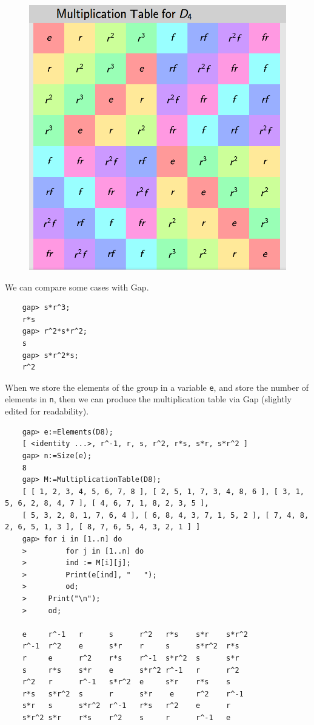 \begin{figure}[H]
    \centering
    \includegraphics[scale=0.25]{images/2023-06-05_groups_gap_D4.png}
\end{figure}

We can compare some cases with Gap.

\begin{verbatim}
    gap> s*r^3;
    r*s
    gap> r^2*s*r^2;
    s
    gap> s*r^2*s;
    r^2
\end{verbatim}

When we store the elements of the group in a variable \verb+e+, and store the number of elements in \verb+n+, then we can produce the multiplication table via Gap (slightly edited for readability).

\begin{verbatim}
    gap> e:=Elements(D8);
    [ <identity ...>, r^-1, r, s, r^2, r*s, s*r, s*r^2 ]
    gap> n:=Size(e);
    8
    gap> M:=MultiplicationTable(D8);
    [ [ 1, 2, 3, 4, 5, 6, 7, 8 ], [ 2, 5, 1, 7, 3, 4, 8, 6 ], [ 3, 1, 5, 6, 2, 8, 4, 7 ], [ 4, 6, 7, 1, 8, 2, 3, 5 ], 
    [ 5, 3, 2, 8, 1, 7, 6, 4 ], [ 6, 8, 4, 3, 7, 1, 5, 2 ], [ 7, 4, 8, 2, 6, 5, 1, 3 ], [ 8, 7, 6, 5, 4, 3, 2, 1 ] ]
    gap> for i in [1..n] do
    >         for j in [1..n] do
    >         ind := M[i][j];
    >         Print(e[ind], "   ");
    >         od;
    >     Print("\n");
    >     od;

    e     r^-1   r      s      r^2   r*s    s*r    s*r^2   
    r^-1  r^2    e      s*r    r     s      s*r^2  r*s   
    r     e      r^2    r*s    r^-1  s*r^2  s      s*r   
    s     r*s    s*r    e      s*r^2 r^-1   r      r^2   
    r^2   r      r^-1   s*r^2  e     s*r    r*s    s   
    r*s   s*r^2  s      r      s*r    e     r^2    r^-1   
    s*r   s      s*r^2  r^-1   r*s   r^2    e      r   
    s*r^2 s*r    r*s    r^2    s     r      r^-1   e   
\end{verbatim}

